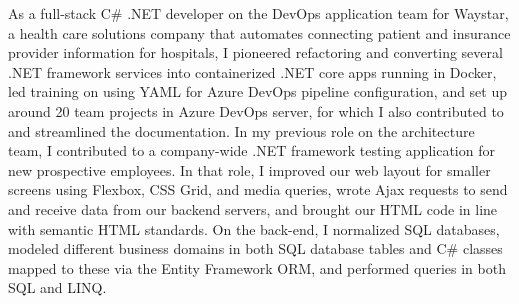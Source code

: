 As a full-stack C\# .NET developer on the DevOps application team for Waystar, a health care solutions company that automates connecting patient and insurance provider information for hospitals, I pioneered refactoring and converting several .NET framework services into containerized .NET core apps running in Docker, led training on using YAML for Azure DevOps pipeline configuration, and set up around 20 team projects in Azure DevOps server, for which I also contributed to and streamlined the documentation. In my previous role on the architecture team, I contributed to a company-wide .NET framework testing application for new prospective employees. In that role, I improved our web layout for smaller screens using Flexbox, CSS Grid, and media queries, wrote Ajax requests to send and receive data from our backend servers, and brought our HTML code in line with semantic HTML standards. On the back-end, I normalized SQL databases, modeled different business domains in both SQL database tables and C\# classes mapped to these via the Entity Framework ORM, and performed queries in both SQL and LINQ.